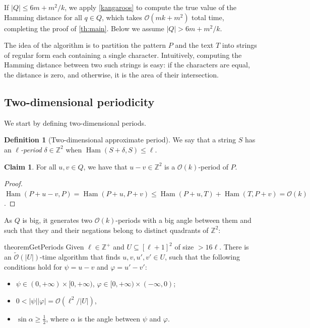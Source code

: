 \documentclass[11pt, letterpaper]{article}
\theoremstyle{plain}
\theoremstyle{definition}
\newtheorem{definition}{Definition}
\newtheorem{claim}{Claim}
\theoremstyle{remark}
\newcommand{\Z}{\mathbb{Z}}
\renewcommand{\O}{\mathcal{O}}
\newcommand{\tO}{\tilde{\mathcal{O}}}
\renewcommand{\phi}{\varphi}
\DeclareMathOperator*{\Ham}{Ham}
\newcommand{\absolute}[1]{\left\lvert#1\right\rvert}
\begin{document}
If $\absolute{Q} \le 6m + m^2/k$, we apply \cref{kangaroos} to compute the true value of the Hamming distance for all $q \in Q$, which takes $\O(mk+m^2)$ total time, completing the proof of \cref{th:main}. Below we assume $\absolute{Q} > 6m + m^2/k$. 

The idea of the algorithm is to partition the pattern $P$ and the text $T$ into strings of regular form each containing a single character. Intuitively, computing the Hamming distance between two such strings is easy: if the characters are equal, the distance is zero, and otherwise, it is the area of their intersection.

\subsection{Two-dimensional periodicity} \label{periodicity_section}
We start by defining two-dimensional periods.



\begin{definition}[Two-dimensional approximate period]
We say that a string $S$ has an \emph{$\ell$-period} $\delta \in \Z^2$ when $\Ham(S + \delta, S) \le \ell$.
\end{definition}


\begin{claim} \label{periodicity_lemma}
For all $u, v \in Q$, we have that $u - v \in \Z^2$ is a $\O(k)$-period of $P$.
\end{claim}	
\begin{proof}
$\Ham(P + u - v, P) = \Ham(P + u, P + v) \le \Ham(P + u, T) + \Ham(T,P + v) = \O(k)$.
\end{proof}

As $Q$ is big, it generates two $\O(k)$-periods with a big angle between them and such that they and their negations belong to distinct quadrants of $\Z^2$: 

\begin{restatable*}{theorem}{GetPeriods}\label{get_periods}
Given $\ell \in \Z^+$ and $U \subseteq [\ell + 1]^2$ of size $> 16\ell$. There is an $\tO(\absolute{U})$-time algorithm that finds $u, v, u', v' \in U$, such that the following conditions hold for $\psi = u - v$ and $\phi = u' - v'$:
	\begin{itemize}
		\item $\psi \in (0, +\infty) \times [0, +\infty)$, $\phi \in [0, +\infty) \times (-\infty, 0)$;
		\item $0 < \absolute{\psi}\absolute{\phi} = \O(\ell^2 / \absolute{U})$,
		\item $\sin \alpha \ge \frac{1}{2}$, where $\alpha$ is the angle between $\psi$ and $\phi$.
	\end{itemize}
\end{restatable*}
\end{document}
